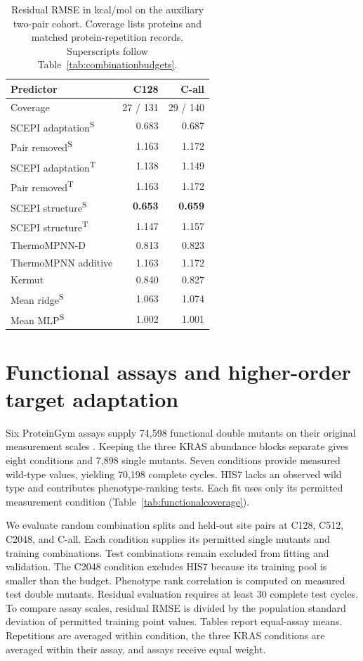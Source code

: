 \documentclass{llncs}
\begin{document}
\begin{table}[H]
\centering
\setlength{\tabcolsep}{4pt}
\caption{Residual RMSE in kcal/mol on the auxiliary two-pair cohort. Coverage lists proteins and matched protein-repetition records. Superscripts follow Table~\ref{tab:combinationbudgets}.}
\label{tab:combinationsecondary}
\begin{tabular}{lrr}
\toprule
Predictor & C128 & C-all \\
\midrule
Coverage & 27 / 131 & 29 / 140 \\
\midrule
SCEPI adaptation\textsuperscript{S} & 0.683 & 0.687 \\
Pair removed\textsuperscript{S} & 1.163 & 1.172 \\
SCEPI adaptation\textsuperscript{T} & 1.138 & 1.149 \\
Pair removed\textsuperscript{T} & 1.163 & 1.172 \\
SCEPI structure\textsuperscript{S} & \textbf{0.653} & \textbf{0.659} \\
SCEPI structure\textsuperscript{T} & 1.147 & 1.157 \\
ThermoMPNN-D & 0.813 & 0.823 \\
ThermoMPNN additive & 1.163 & 1.172 \\
Kermut & 0.840 & 0.827 \\
Mean ridge\textsuperscript{S} & 1.063 & 1.074 \\
Mean MLP\textsuperscript{S} & 1.002 & 1.001 \\
\bottomrule
\end{tabular}
\end{table}

\section{Functional assays and higher-order target adaptation}
\label{app:externaladaptation}

Six ProteinGym assays supply 74,598 functional double mutants on their original measurement scales \citep{notin2023}. Keeping the three KRAS abundance blocks separate gives eight conditions and 7,898 single mutants. Seven conditions provide measured wild-type values, yielding 70,198 complete cycles. HIS7 lacks an observed wild type and contributes phenotype-ranking tests. Each fit uses only its permitted measurement condition (Table~\ref{tab:functionalcoverage}).

We evaluate random combination splits and held-out site pairs at C128, C512, C2048, and C-all. Each condition supplies its permitted single mutants and training combinations. Test combinations remain excluded from fitting and validation. The C2048 condition excludes HIS7 because its training pool is smaller than the budget. Phenotype rank correlation is computed on measured test double mutants. Residual evaluation requires at least 30 complete test cycles. To compare assay scales, residual RMSE is divided by the population standard deviation of permitted training point values. Tables report equal-assay means. Repetitions are averaged within condition, the three KRAS conditions are averaged within their assay, and assays receive equal weight.
\end{document}
